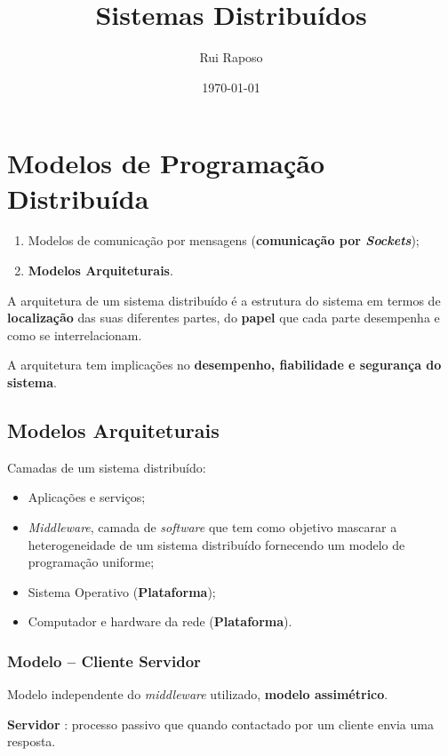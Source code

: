 \documentclass{article}
\date{\today \\ \currenttime}
\title{Sistemas Distribuídos}
\author{Rui Raposo}
\begin{document}
\maketitle

\section{Modelos de Programação Distribuída}

\begin{enumerate}
	\item Modelos de comunicação por mensagens (\textbf{comunicação por \textit{Sockets}});
	\item \textbf{Modelos Arquiteturais}.
\end{enumerate}

A arquitetura de um sistema distribuído é a estrutura do sistema em termos de \textbf{localização} das suas diferentes partes, do \textbf{papel} que cada parte desempenha e como se interrelacionam.

A arquitetura tem implicações no \textbf{desempenho, fiabilidade e segurança do sistema}.

\subsection{Modelos Arquiteturais}

Camadas de um sistema distribuído:
\begin{itemize}
	\item Aplicações e serviços;
	\item \textit{Middleware}, camada de \textit{software} que tem como objetivo mascarar a heterogeneidade de um sistema distribuído fornecendo um modelo de programação uniforme; 
	\item Sistema Operativo (\textbf{Plataforma});
	\item Computador e hardware da rede (\textbf{Plataforma}).
\end{itemize}

\subsubsection{Modelo -- Cliente Servidor}

Modelo independente do \textit{middleware} utilizado, \textbf{modelo assimétrico}.

\textbf{Servidor} : processo passivo que quando contactado por um cliente envia uma resposta.
\end{document}
